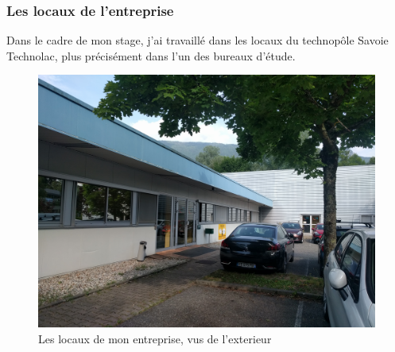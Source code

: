 \documentclass[a4paper]{article}
\begin{document}
    \subsubsection{Les locaux de l'entreprise}

    Dans le cadre de mon stage, j’ai travaillé dans les locaux du technopôle Savoie Technolac, plus précisément dans l'un des bureaux d’étude. \\

    \begin{figure}[H]
        \centering
        \includegraphics[scale=0.05]{img/imgLocaux}
        \caption{Les locaux de mon entreprise, vus de l'exterieur}
    \end{figure}
\end{document}
